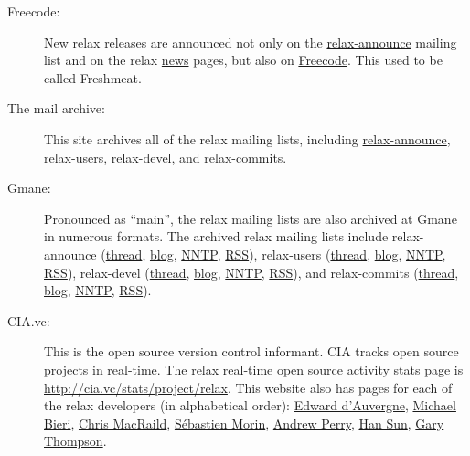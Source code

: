 \begin{description}
\item[Freecode:]  New relax releases are announced not only on the \href{https://mail.gna.org/public/relax-announce/}{relax-announce} mailing list and on the relax \href{https://gna.org/news/?group=relax}{news} pages, but also on \href{http://freecode.com/projects/nmr-relax}{Freecode}.  This used to be called Freshmeat.
\item[The mail archive:]  This site archives all of the relax mailing lists, including \href{http://mail-archive.com/relax-announce@gna.org/}{relax-announce}, \href{http://mail-archive.com/relax-users@gna.org/}{relax-users}, \href{http://mail-archive.com/relax-devel@gna.org/}{relax-devel}, and \href{http://mail-archive.com/relax-commits@gna.org/}{relax-commits}.
\item[Gmane:]  Pronounced as ``main'', the relax mailing lists are also archived at Gmane in numerous formats.  The archived relax mailing lists include relax-announce (\href{http://news.gmane.org/gmane.science.nmr.relax.announce}{thread}, \href{http://blog.gmane.org/gmane.science.nmr.relax.announce}{blog}, \href{nntp://news.gmane.org/gmane.science.nmr.relax.announce}{NNTP}, \href{http://rss.gmane.org/messages/excerpts/gmane.science.nmr.relax.announce}{RSS}), relax-users (\href{http://news.gmane.org/gmane.science.nmr.relax.user}{thread}, \href{http://blog.gmane.org/gmane.science.nmr.relax.user}{blog}, \href{nntp://news.gmane.org/gmane.science.nmr.relax.user}{NNTP}, \href{http://rss.gmane.org/messages/excerpts/gmane.science.nmr.relax.user}{RSS}), relax-devel (\href{http://news.gmane.org/gmane.science.nmr.relax.devel}{thread}, \href{http://blog.gmane.org/gmane.science.nmr.relax.devel}{blog}, \href{nntp://news.gmane.org/gmane.science.nmr.relax.devel}{NNTP}, \href{http://rss.gmane.org/messages/excerpts/gmane.science.nmr.relax.devel}{RSS}), and relax-commits (\href{http://news.gmane.org/gmane.science.nmr.relax.scm}{thread}, \href{http://blog.gmane.org/gmane.science.nmr.relax.scm}{blog}, \href{nntp://news.gmane.org/gmane.science.nmr.relax.scm}{NNTP}, \href{http://rss.gmane.org/messages/excerpts/gmane.science.nmr.relax.scm}{RSS}).
\item[CIA.vc:]  This is the open source version control informant.  CIA tracks open source projects in real-time.  The relax real-time open source activity stats page is \href{http://cia.vc/stats/project/relax}{http://cia.vc/stats/project/relax}.  This website also has pages for each of the relax developers (in alphabetical order):  \href{http://cia.vc/stats/author/bugman}{Edward d'Auvergne}, \href{http://cia.vc/stats/author/michaelbieri}{Michael Bieri}, \href{http://cia.vc/stats/author/macraild}{Chris MacRaild}, \href{http://cia.vc/stats/author/semor}{S\'ebastien Morin}, \href{http://cia.vc/stats/author/pansapiens}{Andrew Perry}, \href{http://cia.vc/stats/author/han87}{Han Sun}, \href{http://cia.vc/stats/author/varioustoxins}{Gary Thompson}.

\end{description}
